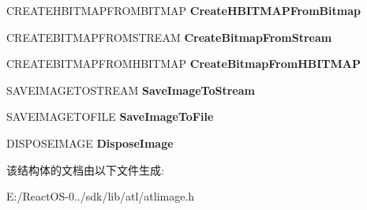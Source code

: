 \begin{DoxyCompactItemize}
\mbox{\label{struct_a_t_l_1_1_c_image_1_1_c_o_m_m_o_n_aa3f99528caa1ca23da4461e7af0c14e4}} 
C\+R\+E\+A\+T\+E\+H\+B\+I\+T\+M\+A\+P\+F\+R\+O\+M\+B\+I\+T\+M\+AP {\bfseries Create\+H\+B\+I\+T\+M\+A\+P\+From\+Bitmap}
\item 
\mbox{\label{struct_a_t_l_1_1_c_image_1_1_c_o_m_m_o_n_ac36136877cc8f8cec681f529a1ea29f7}} 
C\+R\+E\+A\+T\+E\+B\+I\+T\+M\+A\+P\+F\+R\+O\+M\+S\+T\+R\+E\+AM {\bfseries Create\+Bitmap\+From\+Stream}
\item 
\mbox{\label{struct_a_t_l_1_1_c_image_1_1_c_o_m_m_o_n_ad54dba988f2a4a6468f34aacb51e7538}} 
C\+R\+E\+A\+T\+E\+B\+I\+T\+M\+A\+P\+F\+R\+O\+M\+H\+B\+I\+T\+M\+AP {\bfseries Create\+Bitmap\+From\+H\+B\+I\+T\+M\+AP}
\item 
\mbox{\label{struct_a_t_l_1_1_c_image_1_1_c_o_m_m_o_n_aadb072734427fa8d459993070cc3df26}} 
S\+A\+V\+E\+I\+M\+A\+G\+E\+T\+O\+S\+T\+R\+E\+AM {\bfseries Save\+Image\+To\+Stream}
\item 
\mbox{\label{struct_a_t_l_1_1_c_image_1_1_c_o_m_m_o_n_a37a111ed8ae2cc01567cb236cd01b8d9}} 
S\+A\+V\+E\+I\+M\+A\+G\+E\+T\+O\+F\+I\+LE {\bfseries Save\+Image\+To\+File}
\item 
\mbox{\label{struct_a_t_l_1_1_c_image_1_1_c_o_m_m_o_n_a0af59a6b7ac3b501636b146f8c6284b1}} 
D\+I\+S\+P\+O\+S\+E\+I\+M\+A\+GE {\bfseries Dispose\+Image}
\end{DoxyCompactItemize}


该结构体的文档由以下文件生成\+:\begin{DoxyCompactItemize}
\item 
E\+:/\+React\+O\+S-\/0../sdk/lib/atl/atlimage.\+h\end{DoxyCompactItemize}
